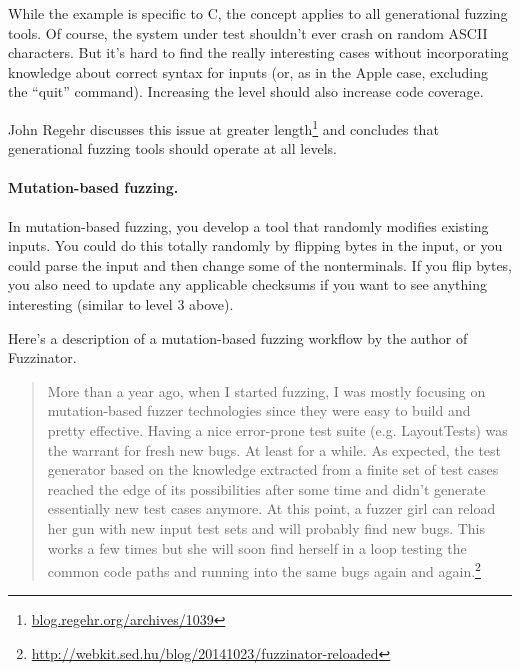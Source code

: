 \documentclass[11pt]{article}
\begin{document}
While the example is specific to C, the concept applies to all
generational fuzzing tools. Of course, the system under test
shouldn't ever crash on random ASCII characters. But it's hard
to find the really interesting cases without incorporating knowledge
about correct syntax for inputs (or, as in the Apple case, excluding
the ``quit'' command). Increasing the level should also increase
code coverage.

John Regehr discusses this issue at greater
length\footnote{\url{blog.regehr.org/archives/1039}} and concludes
that generational fuzzing tools should operate at all levels.

\paragraph{Mutation-based fuzzing.}
In mutation-based fuzzing, you develop a tool that randomly modifies existing
inputs. You could do this totally randomly by flipping bytes in the input,
or you could parse the input and then change some of the nonterminals.
If you flip bytes, you also need to update any applicable
checksums if you want to see anything interesting (similar to
level 3 above).

Here's a description of a mutation-based fuzzing workflow by the author of Fuzzinator.
{\small
\begin{quote}
  More than a year ago, when I started fuzzing, I was mostly focusing on mutation-based fuzzer technologies since they were easy to build and pretty effective. Having a nice error-prone test suite (e.g. LayoutTests) was the warrant for fresh new bugs. At least for a while. As expected, the test generator based on the knowledge extracted from a finite set of test cases reached the edge of its possibilities after some time and didn't generate essentially new test cases anymore. At this point, a fuzzer girl can reload her gun with new input test sets and will probably find new bugs. This works a few times but she will soon find herself in a loop testing the common code paths and running into the same bugs again and again.\footnote{\url{http://webkit.sed.hu/blog/20141023/fuzzinator-reloaded}}
\end{quote}
}



\end{document}
